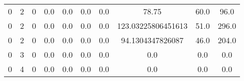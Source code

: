 \begin{sidewaystable}
\begin{tabular*}{\linewidth}{SSSSSSSSSS}
    0            & 2           & 0        & 0.0           & 0.0           & 0.0              & 0.0               & 78.75                 & 60.0                  & 96.0                  \\
    0            & 2           & 0        & 0.0           & 0.0           & 0.0              & 0.0               & 123.03225806451613    & 51.0                  & 296.0                 \\
    0            & 2           & 0        & 0.0           & 0.0           & 0.0              & 0.0               & 94.1304347826087      & 46.0                  & 204.0                 \\
    0            & 3           & 0        & 0.0           & 0.0           & 0.0              & 0.0               & 0.0                   & 0.0                   & 0.0                   \\
    0            & 4           & 0        & 0.0           & 0.0           & 0.0              & 0.0               & 0.0                   & 0.0                   & 0.0                   \\
    \bottomrule
  \end{tabular*}\label{table:feature_table_example}

\end{sidewaystable}
